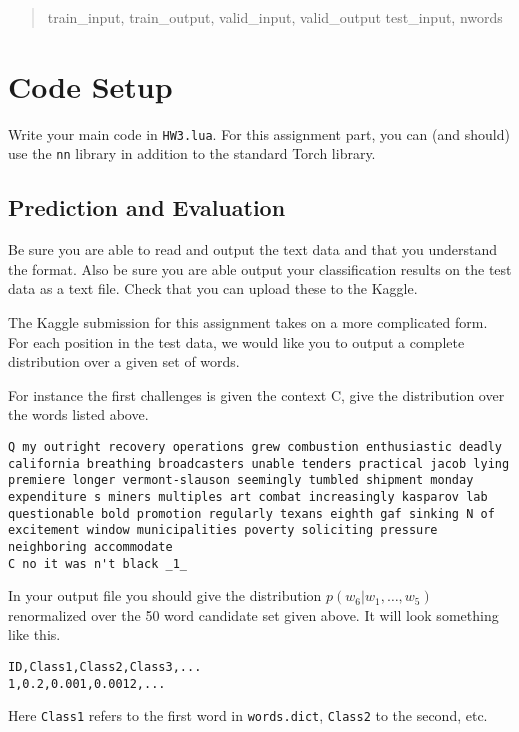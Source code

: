 \documentclass[11pt]{article}
\begin{document}
\begin{quote}
  train\_input, train\_output,
  valid\_input,
  valid\_output
  test\_input, nwords
\end{quote}

\section{Code Setup}

Write your main code in \texttt{HW3.lua}. For this assignment part,
you can (and should) use the \texttt{nn} library in addition to the
standard Torch library. 

\subsection{Prediction and Evaluation}

Be sure you are able to read and output the text data and that you
understand the format.  Also be sure you are able output your
classification results on the test data as a text file. Check that you
can upload these to the Kaggle. 

The Kaggle submission for this assignment takes on a more complicated form. 
For each position in the test data, we would like you to output a complete 
distribution over a given set of words.

For instance the first challenges is given the context C, give the distribution
over the words listed above. 

\begin{lstlisting}
Q my outright recovery operations grew combustion enthusiastic deadly california breathing broadcasters unable tenders practical jacob lying premiere longer vermont-slauson seemingly tumbled shipment monday expenditure s miners multiples art combat increasingly kasparov lab questionable bold promotion regularly texans eighth gaf sinking N of excitement window municipalities poverty soliciting pressure neighboring accommodate
C no it was n't black _1_
\end{lstlisting}

In your output file you should give the distribution $p(w_6 | w_1, \ldots, w_5)$ renormalized
over the 50 word candidate set given above. It will look something like this.

\begin{verbatim}
ID,Class1,Class2,Class3,...
1,0.2,0.001,0.0012,...
\end{verbatim}

\noindent Here \texttt{Class1} refers to the first word in \texttt{words.dict}, \texttt{Class2} to the second, etc.
\end{document}
